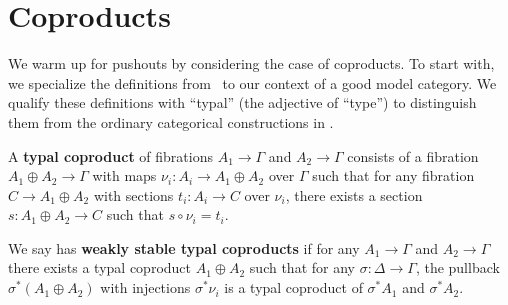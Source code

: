 



\section{Coproducts}
\label{sec:coproducts}

We warm up for pushouts by considering the case of coproducts.
To start with, we specialize the definitions from~\cite[.1]{lw:localuniv} to our context of a good model category.
We qualify these definitions with ``typal'' (the adjective of ``type'') to distinguish them from the ordinary categorical constructions in \sM.

\begin{defn}\label{defn:sum}
  A \textbf{typal coproduct} of fibrations $A_1\to \Gamma$ and $A_2\to\Gamma$ consists of a fibration $A_1\oplus A_2 \to\Gamma$ with maps $\nu_i: A_i \to A_1\oplus A_2$ over $\Gamma$ such that for any fibration $C\to A_1\oplus A_2$ with sections $t_i : A_i \to C$ over $\nu_i$, there exists a section $s:A_1\oplus A_2 \to C$ such that $s\circ \nu_i = t_i$.

  We say \sM has \textbf{weakly stable typal coproducts} if for any $A_1\to \Gamma$ and $A_2\to\Gamma$ there exists a typal coproduct $A_1\oplus A_2$ such that for any $\sigma:\Delta\to\Gamma$, the pullback $\sigma^*(A_1\oplus A_2)$ with injections $\sigma^*\nu_i$ is a typal coproduct of $\sigma^*A_1$ and $\sigma^* A_2$.
\end{defn}

